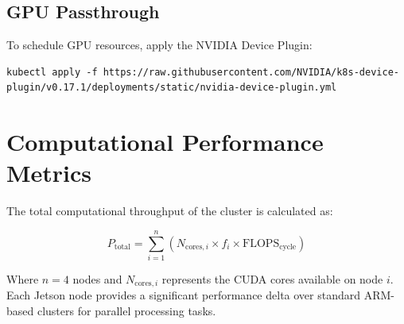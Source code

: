 \documentclass[11pt,a4paper]{article}
\begin{document}
\subsection{GPU Passthrough}
To schedule GPU resources, apply the NVIDIA Device Plugin:
\begin{verbatim}
kubectl apply -f https://raw.githubusercontent.com/NVIDIA/k8s-device-plugin/v0.17.1/deployments/static/nvidia-device-plugin.yml
\end{verbatim}

\section{Computational Performance Metrics}
The total computational throughput of the cluster is calculated as:

\begin{equation}
P_{\text{total}} = \sum_{i=1}^{n} (N_{\text{cores}, i} \times f_{i} \times \text{FLOPS}_{\text{cycle}})
\end{equation}

Where $n = 4$ nodes and $N_{\text{cores}, i}$ represents the CUDA cores available on node $i$. Each Jetson node provides a significant performance delta over standard ARM-based clusters for parallel processing tasks.
\end{document}
